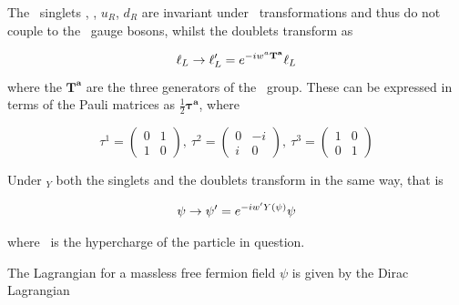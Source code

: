 The \sutwo\ singlets \eR, \nuR, $u_{R}$, $d_{R}$ are invariant under \sutwo\
transformations and thus do not couple to the \Wmu\ gauge bosons, whilst the
doublets transform as

\begin{equation}
\ell_{L} \rightarrow \ell_{L}' = e^{-iw^{a}\mathbf{T^{a}}}\ell_{L}
\end{equation}
where the $\mathbf{T^{a}}$ are the three generators of the \sutwo\ group. These
can be expressed in terms of the Pauli matrices as $\frac{1}{2}
\mathbf{\tau^{a}}$, where

\begin{equation}
\tau^{1} = \left( \begin{array}{cc} 0 & 1 \\ 1 & 0 \end{array} \right), \  
\tau^{2} = \left( \begin{array}{cc} 0 & -i \\ i & 0 \end{array} \right), \  
\tau^{3} = \left( \begin{array}{cc} 1 & 0 \\ 0 & 1 \end{array} \right)
\label{eqn:pauli-matrices}
\end{equation}

Under \uone$_{Y}$ both the singlets and the doublets transform in the same way,
that is

\begin{align}
\psi \ra \psi' = e^{-i w' \hyperY(\psi)} \psi
\label{eqn:u1-transofrmation}
\end{align}

where \hyperY\ is the hypercharge of the particle in question.

The Lagrangian for a massless free fermion field $\psi$ is given by the Dirac Lagrangian

